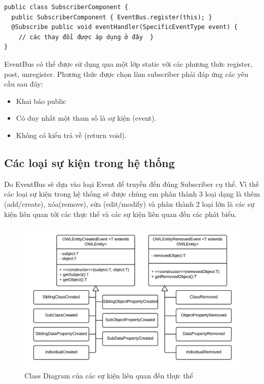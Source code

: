 {\begin{verbatim}
public class SubscriberComponent {
  public SubscriberComponent { EventBus.register(this); }
  @Subscribe public void eventHandler(SpecificEventType event) { 
  	// các thay đổi được áp dụng ở đây  }
}
\end{verbatim}
EventBus có thể được sử dụng qua một lớp static với các phương thức register, post, unregister. Phương thức được chọn làm subscriber phải đáp ứng các yêu cầu sau đây:
\begin{itemize}
\item Khai báo public
\item Có duy nhất một tham số là sự kiện (event).
\item Không có kiểu trả về (return void).
\end{itemize}
\subsection{Các loại sự kiện trong hệ thống}
Do EventBus sẽ dựa vào loại Event để truyền đến đúng Subscriber cụ thể. Vì thế các loại sự kiện trong hệ thống sẽ được chúng em phân thành 3 loại dạng là thêm (add/create), xóa(remove), sửa (edit/modify) và phân thành 2 loại lớn là các sự kiện liên quan tới các thực thể và các sự kiện liên quan đến các phát biểu.
\begin{figure}[h!]
	\centering
	\includegraphics[width=150mm]{Figures/uml_entity_event.png}
	\caption{Class Diagram của các sự kiện liên quan đến thực thể\label{overflow}}
\end{figure}
\begin{figure}[h!]
	\centering

\end{figure}}
